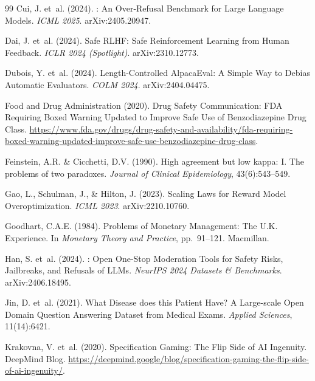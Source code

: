 \documentclass{article}
\begin{document}
\begin{thebibliography}{99}
Cui, J. et~al. (2024).
: An Over-Refusal Benchmark for Large Language Models.
\newblock \emph{ICML 2025}. arXiv:2405.20947.

Dai, J. et~al. (2024).
\newblock Safe {RLHF}: Safe Reinforcement Learning from Human Feedback.
\newblock \emph{ICLR 2024 (Spotlight)}. arXiv:2310.12773.

Dubois, Y. et~al. (2024).
\newblock Length-Controlled {AlpacaEval}: A Simple Way to Debias Automatic Evaluators.
\newblock \emph{COLM 2024}. arXiv:2404.04475.

Food and Drug Administration (2020).
 Drug Safety Communication: {FDA} Requiring Boxed Warning Updated to Improve Safe Use of Benzodiazepine Drug Class.
\newblock \url{https://www.fda.gov/drugs/drug-safety-and-availability/fda-requiring-boxed-warning-updated-improve-safe-use-benzodiazepine-drug-class}.

Feinstein, A.R. \& Cicchetti, D.V. (1990).
\newblock High agreement but low kappa: {I}. {T}he problems of two paradoxes.
\newblock \emph{Journal of Clinical Epidemiology}, 43(6):543--549.

Gao, L., Schulman, J., \& Hilton, J. (2023).
\newblock Scaling Laws for Reward Model Overoptimization.
\newblock \emph{ICML 2023}. arXiv:2210.10760.

Goodhart, C.A.E. (1984).
\newblock Problems of Monetary Management: The {U.K.} Experience.
\newblock In \emph{Monetary Theory and Practice}, pp.~91--121. Macmillan.

Han, S. et~al. (2024).
: Open One-Stop Moderation Tools for Safety Risks, Jailbreaks, and Refusals of {LLMs}.
\newblock \emph{NeurIPS 2024 Datasets \& Benchmarks}. arXiv:2406.18495.

Jin, D. et~al. (2021).
\newblock What Disease does this Patient Have? {A} Large-scale Open Domain Question Answering Dataset from Medical Exams.
\newblock \emph{Applied Sciences}, 11(14):6421.

Krakovna, V. et~al. (2020).
\newblock Specification Gaming: The Flip Side of {AI} Ingenuity.
\newblock DeepMind Blog. \url{https://deepmind.google/blog/specification-gaming-the-flip-side-of-ai-ingenuity/}.


\end{thebibliography}
\end{document}
